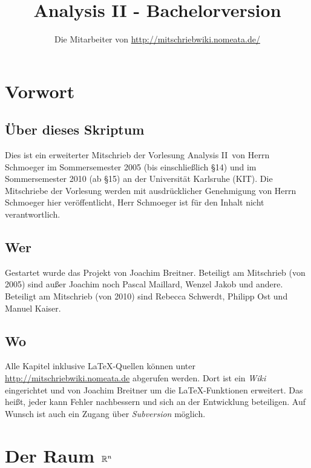 \documentclass[a4paper,twoside,DIV15,BCOR12mm,chapterprefix=true,headings=twolinechapter]{scrbook}
\author{Die Mitarbeiter von \url{http://mitschriebwiki.nomeata.de/}}
\title{Analysis II - Bachelorversion}
\begin{document}
\maketitle

\renewcommand{\thechapter}{\Roman{chapter}}
\tableofcontents

\chapter{Vorwort}

\section{Über dieses Skriptum}
Dies ist ein erweiterter Mitschrieb der Vorlesung \glqq Analysis II\grqq\ von Herrn Schmoeger im
Sommersemester 2005 (bis einschließlich §14) und im Sommersemester 2010 (ab §15) an der Universität 
Karlsruhe (KIT). Die Mitschriebe der Vorlesung werden mit ausdrücklicher Genehmigung 
von Herrn Schmoeger hier veröffentlicht, Herr Schmoeger ist für den Inhalt nicht 
verantwortlich.

\section{Wer}
Gestartet wurde das Projekt von Joachim Breitner. Beteiligt am Mitschrieb (von 2005) sind außer Joachim
noch Pascal Maillard, Wenzel Jakob und andere. 
Beteiligt am Mitschrieb (von 2010) sind Rebecca Schwerdt, Philipp Ost und Manuel Kaiser.

\section{Wo}
Alle Kapitel inklusive \LaTeX-Quellen können unter \url{http://mitschriebwiki.nomeata.de} abgerufen werden.
Dort ist ein \emph{Wiki} eingerichtet und von Joachim Breitner um die \LaTeX-Funktionen erweitert.
Das heißt, jeder kann Fehler nachbessern und sich an der Entwicklung
beteiligen. Auf Wunsch ist auch ein Zugang über \emph{Subversion} möglich.


\renewcommand{\thechapter}{\arabic{chapter}}
\renewcommand{\chaptername}{§}
\setcounter{chapter}{0}

\chapter{Der Raum $\mathbb{R}^n$}
\end{document}
